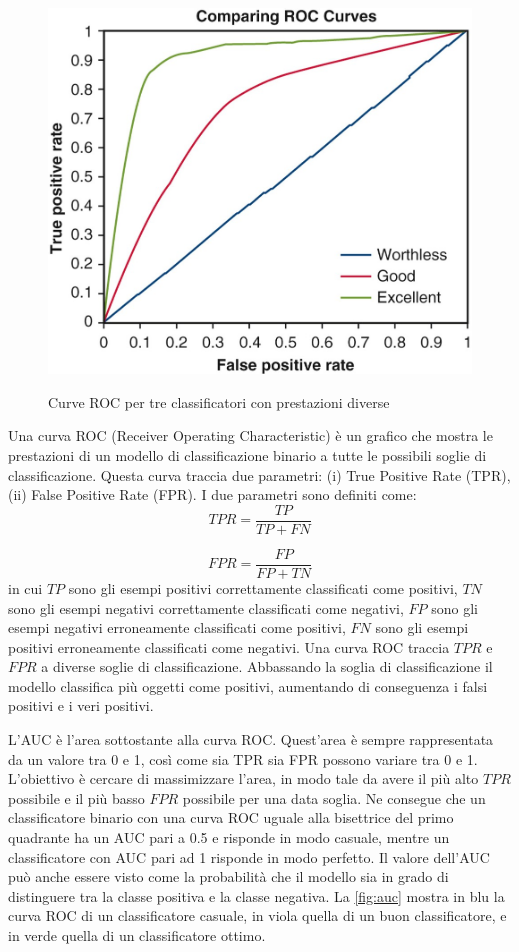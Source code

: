 \documentclass[12pt,italian]{report}
\begin{document}
\begin{figure}
  \centering
  \includegraphics[scale=0.50]{immagini/AUC.jpg}
  \caption{Curve ROC per tre classificatori con prestazioni diverse}
  \cite{auc-picture}
  \label{fig:auc}
\end{figure}

Una curva ROC (Receiver Operating Characteristic) è un grafico che mostra le prestazioni di un modello di classificazione binario a tutte le possibili soglie di classificazione. Questa curva traccia due parametri: (i) True Positive Rate (TPR), (ii) False Positive Rate (FPR). I due parametri sono definiti come:
$$
TPR = \frac{TP}{TP+FN}
$$

$$
FPR = \frac{FP}{FP+TN}
$$
in cui $TP$ sono gli esempi positivi correttamente classificati come positivi, $TN$ sono gli esempi negativi correttamente classificati come negativi, $FP$ sono gli esempi negativi erroneamente classificati come positivi, $FN$ sono gli esempi positivi erroneamente classificati come negativi. Una curva ROC traccia $TPR$ e $FPR$ a diverse soglie di classificazione. Abbassando la soglia di classificazione il modello classifica più oggetti come positivi, aumentando di conseguenza i falsi positivi e i veri positivi. 

L'AUC è l'area sottostante alla curva ROC. Quest'area è sempre rappresentata da un valore tra 0 e 1, così come sia TPR sia FPR possono variare tra 0 e 1. L'obiettivo è cercare di massimizzare l'area, in modo tale da avere il più alto $TPR$ possibile e il più basso $FPR$ possibile per una data soglia. Ne consegue che un classificatore binario con una curva ROC uguale alla bisettrice del primo quadrante ha un AUC pari a 0.5 e risponde in modo casuale,  mentre un classificatore con AUC pari ad 1 risponde in modo perfetto. Il valore dell'AUC può anche essere visto come la probabilità che il modello sia in grado di distinguere tra la classe positiva e la classe negativa. La \autoref{fig:auc} mostra in blu la curva ROC di un classificatore casuale, in viola quella di un buon classificatore, e in verde quella di un classificatore ottimo. 
\end{document}
